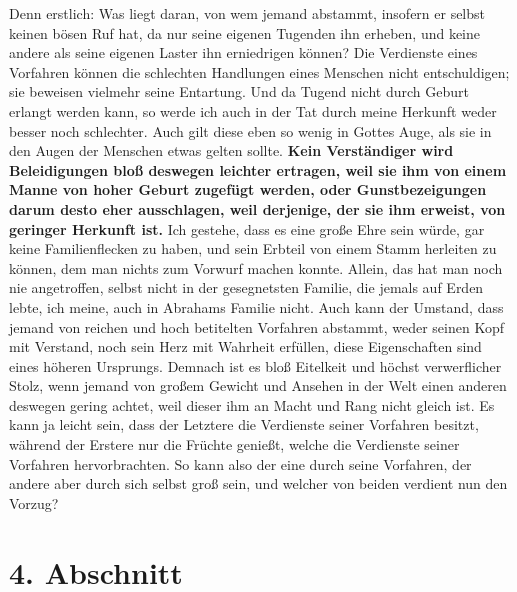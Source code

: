 Denn erstlich: Was liegt daran, von wem jemand
abstammt, insofern er selbst
keinen bösen Ruf hat, da nur seine eigenen Tugenden ihn erheben, und keine
andere als seine eigenen Laster ihn erniedrigen können? Die Verdienste eines
Vorfahren können die schlechten Handlungen eines Menschen nicht
entschuldigen;
sie beweisen vielmehr seine Entartung. Und da Tugend nicht durch Geburt erlangt
werden kann, so werde ich auch in der Tat durch meine Herkunft weder besser noch
schlechter. Auch gilt diese eben so wenig in Gottes Auge, als sie in den Augen
der Menschen etwas gelten sollte. \label{ref:11_03_beleidigung}
\textbf{Kein Verständiger wird Beleidigungen bloß
deswegen leichter ertragen, weil sie ihm von einem Manne von hoher Geburt
zugefügt werden, oder Gunstbezeigungen darum desto eher ausschlagen, weil
derjenige, der sie ihm erweist, von geringer Herkunft ist.} Ich gestehe, dass es
eine große Ehre sein würde, gar keine Familienflecken zu haben, und sein
Erbteil von einem Stamm herleiten zu können, dem man nichts zum Vorwurf
machen konnte. Allein, das hat man noch nie angetroffen, selbst nicht in der
gesegnetsten Familie, die jemals auf Erden lebte, ich meine, auch in
Abrahams
Familie nicht. Auch kann der Umstand, dass jemand von reichen und hoch betitelten
Vorfahren abstammt, weder seinen Kopf mit Verstand, noch sein Herz mit Wahrheit
erfüllen, diese Eigenschaften sind eines höheren Ursprungs. Demnach ist es bloß
Eitelkeit und höchst verwerflicher Stolz, wenn jemand von großem
Gewicht und
Ansehen in der Welt einen anderen deswegen gering achtet, weil dieser ihm an
Macht und Rang nicht gleich ist. Es kann ja leicht sein, dass der Letztere die
Verdienste seiner Vorfahren besitzt, während der Erstere nur die Früchte
genießt, welche die Verdienste seiner Vorfahren hervorbrachten. So kann also der
eine durch seine Vorfahren, der andere aber durch sich selbst groß sein, und
welcher von beiden verdient nun den Vorzug?

\section{4. Abschnitt} \label{kap11_ab4}

